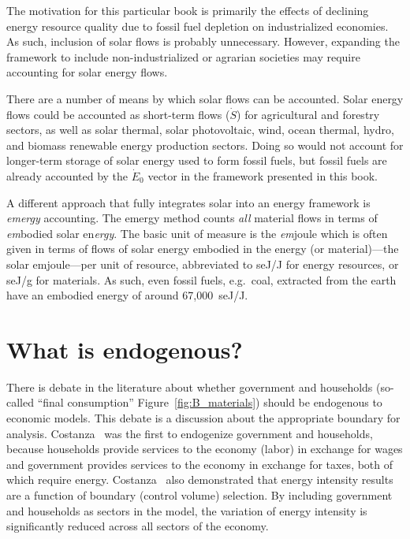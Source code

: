 The motivation for this particular book is primarily 
the effects of declining energy resource quality
due to fossil fuel depletion on industrialized economies. 
As such, inclusion of solar flows is probably unnecessary. 
However, expanding the framework to include non-industrialized 
or agrarian societies may require accounting for solar energy flows. 

There are a number of means by which solar flows can be accounted. 
Solar energy flows could be accounted as short-term flows ($\dot{S}$)
for agricultural and forestry sectors, 
as well as 
solar thermal, 
solar photovoltaic, 
wind, 
ocean thermal, 
hydro, and
biomass
renewable energy
production sectors.
Doing so would not account for longer-term storage
of solar energy used to form fossil fuels, 
but fossil fuels are already accounted by the $\dot{E}_{0}$ vector
in the framework presented in this book.

A different approach that fully integrates solar 
into an energy framework is \emph{emergy} accounting.
The emergy method counts \emph{all} material flows 
in terms of \emph{em}bodied solar en\emph{ergy}.\cite{Odum1975, Odum1996}
The basic unit of measure is 
the \emph{em}joule which is often given in terms 
of flows of solar energy embodied in 
the energy (or material)---the solar emjoule---per unit of resource, 
abbreviated to seJ/J for energy resources, 
or seJ/g for materials. 
As such, even fossil fuels, e.g.\ coal, 
extracted from the earth have an embodied energy 
of around 67,000~seJ/J.\cite{Brown2004} 


\section{What is endogenous?}
\label{sec:what_is_endogenous}

There is debate in the literature about whether government 
and households 
(so-called ``final consumption'' Figure~\ref{fig:B_materials}) 
should be endogenous to economic models.
This debate is a discussion about the appropriate boundary
for analysis.
Costanza~\cite{Costanza:1980ww} was the first to endogenize government and households, 
because households provide services to the economy (labor) in exchange for wages 
and government provides services to the economy in exchange for taxes, 
both of which require energy. 
Costanza~\cite{Costanza:1980ww} also demonstrated that 
energy intensity results
are a function of boundary (control volume) selection. 
By including government and households 
as sectors in the model, 
the variation of energy intensity is significantly reduced 
across all sectors of the economy. 

